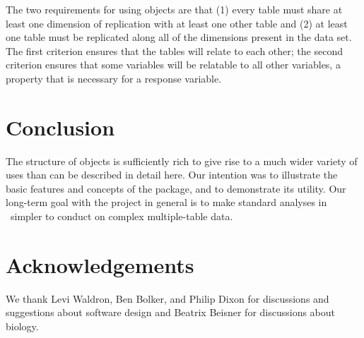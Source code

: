 \documentclass[a4paper]{report}
\numberwithin{exercise}{section}
\begin{document}
\begin{article}
The two requirements for using  objects are that (1) every table must share at least one dimension of replication with at least one other table and (2) at least one table must be replicated along all of the dimensions present in the data set.  The first criterion ensures that the tables will relate to each other; the second criterion ensures that some variables will be relatable to all other variables, a property that is necessary for a response variable.

\section{Conclusion}

The structure of  objects is sufficiently rich to give rise to a much wider variety of uses than can be described in detail here.  Our intention was to illustrate the basic features and concepts of the  package, and to demonstrate its utility.  Our long-term goal with the  project in general is to make standard analyses in \R\ simpler to conduct on complex multiple-table data.

\section*{Acknowledgements}
We thank Levi Waldron, Ben Bolker, and Philip Dixon for discussions and suggestions about software design and Beatrix Beisner for discussions about biology.




\end{article}
\end{document}
